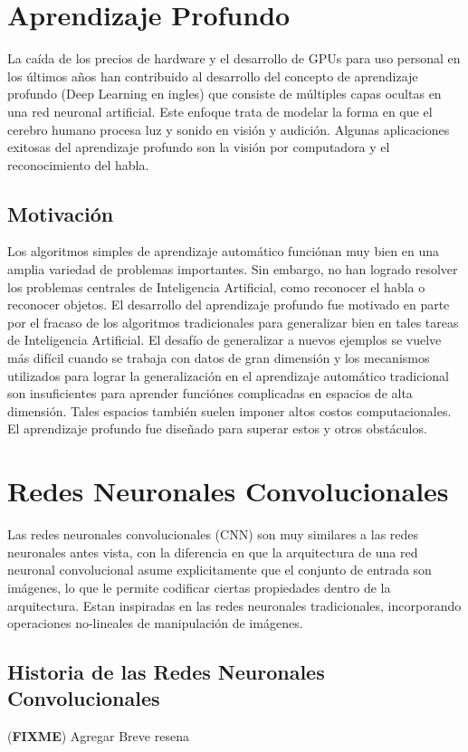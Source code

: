 \documentclass[a4paper,11pt,spanish]{book}
\newcommand*{\FIXME}[1]{{(\textbf{FIXME}) {#1}}}
\begin{document}
  \section {Aprendizaje Profundo}
    La caída de los precios de hardware y el desarrollo de GPUs para uso personal en los últimos años han contribuido al desarrollo del concepto de aprendizaje profundo (Deep Learning en ingles)
    que consiste de múltiples capas ocultas en una red neuronal artificial. Este enfoque trata de modelar la forma en que el cerebro humano procesa luz y sonido en visión y audición.
    Algunas aplicaciones exitosas del aprendizaje profundo son la visión por computadora y el reconocimiento del habla.
    \subsection {Motivación}
      Los algoritmos simples de aprendizaje automático funciónan muy bien en una amplia variedad de problemas importantes. 
      Sin embargo, no han logrado resolver los problemas centrales de Inteligencia Artificial, como reconocer el habla o reconocer objetos. 
      El desarrollo del aprendizaje profundo fue motivado en parte por el fracaso de los algoritmos tradicionales para generalizar bien en tales tareas de Inteligencia Artificial.
      El desafío de generalizar a nuevos ejemplos se vuelve más difícil cuando se trabaja con datos de gran dimensión y los mecanismos utilizados para lograr la generalización 
      en el aprendizaje  automático tradicional son insuficientes para aprender funciónes complicadas en espacios de alta dimensión. 
      Tales espacios también suelen imponer altos costos computacionales. El aprendizaje profundo fue diseñado para superar estos y otros obstáculos.

  \section {Redes Neuronales Convolucionales}
    Las redes neuronales convolucionales (CNN) son muy similares a las redes neuronales antes vista, con la diferencia en que la arquitectura de una red neuronal convolucional asume explicitamente
    que el conjunto de entrada son imágenes, lo que le permite codificar ciertas propiedades dentro de la arquitectura. 
    Estan inspiradas en las redes neuronales tradicionales, incorporando operaciones no-lineales de manipulación de imágenes.

    \subsection {Historia de las Redes Neuronales Convolucionales}
      \FIXME{Agregar Breve resena}
\end{document}
